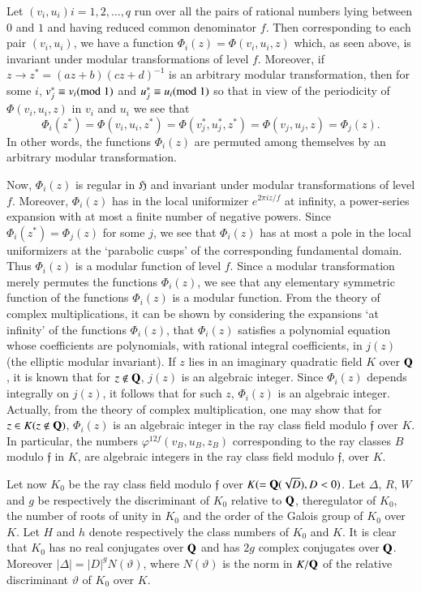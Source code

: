 Let $(v_{i},u_{i})i=1,2,\ldots,q$ run over all the pairs of rational
numbers lying between $0$ and $1$ and having reduced common
denominator $f$. Then corresponding to each pair $(v_{i},u_{i})$, we
have a function $\Phi_{i}(z)=\Phi(v_{i},u_{i},z)$ which, as seen
above, is invariant under modular transformations of level
$f$. Moreover, if $z\to z^{\ast}=(az+b)(cz+d)^{-1}$ is an arbitrary
modular transformation, then for some $i$, $v^{\ast}_{j}\equiv
v_{i}(\rm{mod} \; 1)$ and $u^{\ast}_{j}\equiv u_{i}(\rm{mod} \; 1)$ so that in view
of the periodicity of $\Phi(v_{i},u_{i},z)$ in $v_{i}$ and $u_{i}$ we
see that
$$
\Phi_{i}(z^{\ast})=\Phi(v_{i},u_{i},z^{\ast})=\Phi(v^{\ast}_{j},u^{\ast}_{j},z^{\ast})=\Phi(v_{j},u_{j},z)=\Phi_{j}(z).
$$
In other words, the functions $\Phi_{i}(z)$ are permuted among
themselves by an arbitrary modular transformation.

Now, $\Phi_{i}(z)$ is regular in $\mathfrak{H}$ and invariant under
modular transformations of level $f$. Moreover, $\Phi_{i}(z)$ has in
the local uniformizer $e^{2\pi iz/f}$ at infinity, a power-series
expansion with at most a finite number of negative powers. Since
$\Phi_{i}(z^{\ast})=\Phi_{j}(z)$ for some $j$, we see that
$\Phi_{i}(z)$ has at most a pole in the local uniformizers at the
`parabolic cusps' of the corresponding fundamental domain. Thus
$\Phi_{i}(z)$ is a modular function of level $f$. Since a modular
transformation merely permutes the functions $\Phi_{i}(z)$, we see
that any elementary symmetric function of the functions $\Phi_{i}(z)$
is a modular function. From the theory of complex multiplications, it
can be shown by considering the expansions `at infinity' of the
functions $\Phi_{i}(z)$, that $\Phi_{i}(z)$ satisfies a polynomial
equation whose coefficients are polynomials, with rational integral
coefficients, in $j(z)$ (the elliptic modular invariant). If $z$ lies
in an imaginary quadratic field $K$ over $\mathbf{Q}$, it is known that for
$z\not\in \mathbf{Q}$, $j(z)$ is an algebraic integer. Since $\Phi_{i}(z)$
depends integrally on $j(z)$, it follows that for such $z$,
$\Phi_{i}(z)$ is an algebraic integer. Actually, from the theory of
complex multiplication, one may show that for $z\in K(z\not\in \mathbf{Q})$,
$\Phi_{i}(z)$ is an algebraic integer in the ray class field modulo
$\mathfrak{f}$ over $K$. In particular, the numbers
$\varphi^{12f}(v_{B},u_{B},z_{B})$ corresponding to the ray classes
$B$ modulo $\mathfrak{f}$ in $K$, are algebraic integers in the ray
class field modulo $\mathfrak{f}$, over $K$.

Let now $K_{0}$ be the ray class field modulo $\mathfrak{f}$ over
$K(=\mathbf{Q}(\sqrt{D}),D<0)$. Let $\Delta$, $R$, $W$ and $g$ be
respectively the discriminant of $K_{0}$ relative to $\mathbf{Q}$,
the\pageoriginale regulator of $K_{0}$, the number of roots of unity
in $K_{0}$ and the order of the Galois group of $K_{0}$ over $K$. Let
$H$ and $h$ denote respectively the class numbers of $K_{0}$ and
$K$. It is clear that $K_{0}$ has no real conjugates over $\mathbf{Q}$ and
has $2g$ complex conjugates over $\mathbf{Q}$. Moreover
$|\Delta|=|D|^{g}N(\vartheta)$, where $N(\vartheta)$ is the norm in
$K/\mathbf{Q}$ of the relative discriminant $\vartheta$ of $K_{0}$ over $K$.

